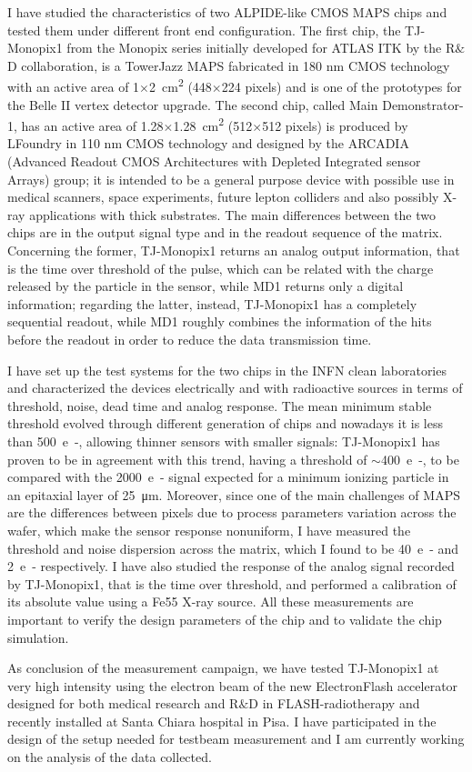 I have studied the characteristics of two ALPIDE-like CMOS MAPS chips and tested them under different front end configuration. The first chip, the TJ-Monopix1 from the Monopix series initially developed for ATLAS ITK by the R$\&$D collaboration, is a TowerJazz MAPS fabricated in 180 nm CMOS technology with an active area of 1$\times$2~\si{cm\squared} (448$\times$224 pixels) and is one of the prototypes for the Belle II vertex detector upgrade. The second chip, called Main Demonstrator-1, has an active area of 1.28$\times$1.28~\si{cm\squared} (512$\times$512 pixels) is produced by LFoundry in 110 nm CMOS technology and designed by the ARCADIA (Advanced Readout CMOS Architectures with Depleted Integrated sensor Arrays) group; it is intended to be a general purpose device with possible use in medical scanners, space experiments, future lepton colliders and also possibly X-ray applications with thick substrates.  
The main differences between the two chips are in the output signal type and in the readout sequence of the matrix. Concerning the former, TJ-Monopix1 returns an analog output information, that is the time over threshold of the pulse, which can be related with the charge released by the particle in the sensor, while MD1 returns only a digital information; regarding the latter, instead, TJ-Monopix1 has a completely sequential readout, while MD1 roughly combines the information of the hits before the readout in order to reduce the data transmission time.

I have set up the test systems for the two chips in the INFN clean laboratories and characterized the devices electrically and with radioactive sources in terms of threshold, noise, dead time and analog response.
The mean minimum stable threshold evolved through different generation of chips and nowadays it is less than \SI{500}{e-}, allowing thinner sensors with smaller signals: TJ-Monopix1 has proven to be in agreement with this trend, having a threshold of $\sim$\SI{400}{e-}, to be compared with the \SI{2000}{e-} signal expected for a minimum ionizing particle in an epitaxial layer of \SI{25}{\um}. 
Moreover, since one of the main challenges of MAPS are the differences between pixels due to process parameters variation across the wafer, which make the sensor response nonuniform, I have measured the threshold and noise dispersion across the matrix, which I found to be \SI{40}{e-} and \SI{2}{e-} respectively.
I have also studied the response of the analog signal recorded by TJ-Monopix1, that is the time over threshold, and performed a calibration of its absolute value using a Fe55 X-ray source.
All these measurements are important to verify the design parameters of the chip and to validate the chip simulation. 

As conclusion of the measurement campaign, we have tested TJ-Monopix1 at very high intensity using the electron beam of the new ElectronFlash accelerator designed for both medical research and R$\&$D in FLASH-radiotherapy and recently installed at Santa Chiara hospital in Pisa. I have participated in the design of the setup needed for testbeam measurement and I am currently working on the analysis of the data collected. 